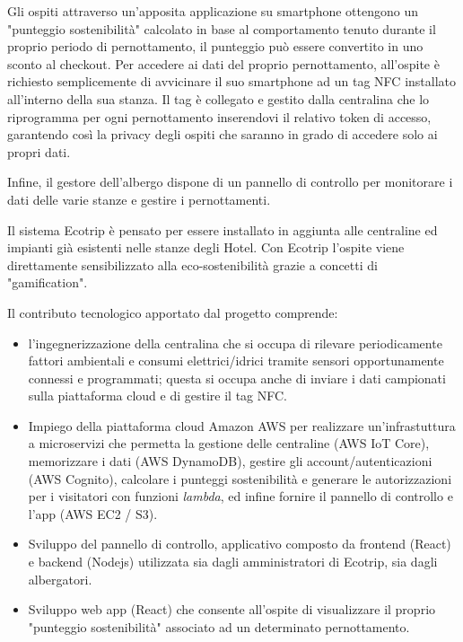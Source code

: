 Gli ospiti attraverso un'apposita applicazione su smartphone ottengono un "punteggio sostenibilità" calcolato in base al comportamento tenuto durante il proprio periodo di pernottamento, il punteggio 
può essere convertito in uno sconto al checkout. Per accedere ai dati del proprio pernottamento, all'ospite è richiesto semplicemente di avvicinare il suo smartphone ad un tag NFC installato all'interno della sua stanza.
Il tag è collegato e gestito dalla centralina che lo riprogramma per ogni pernottamento inserendovi il relativo token di accesso, garantendo così la privacy degli ospiti che saranno in grado di accedere solo ai propri dati.

Infine, il gestore dell'albergo dispone di un pannello di controllo per monitorare i dati delle varie stanze e gestire i pernottamenti.

Il sistema Ecotrip è pensato per essere installato in aggiunta alle centraline ed impianti già esistenti nelle stanze degli Hotel. 
Con Ecotrip l'ospite viene direttamente sensibilizzato alla eco-sostenibilità grazie a concetti di "gamification".


Il contributo tecnologico apportato dal progetto comprende:
\begin{itemize}
    \item l'ingegnerizzazione della centralina che si occupa di rilevare periodicamente fattori ambientali e consumi elettrici/idrici tramite sensori opportunamente connessi e programmati; questa si occupa anche di inviare i dati campionati sulla piattaforma cloud e di gestire il tag NFC. 
    \item Impiego della piattaforma cloud Amazon AWS per realizzare un'infrastuttura a microservizi che permetta la gestione delle centraline (AWS IoT Core), memorizzare i dati (AWS DynamoDB), gestire gli account/autenticazioni (AWS Cognito), calcolare i punteggi sostenibilità e generare le autorizzazioni per i visitatori con funzioni \textit{lambda}, ed infine fornire il pannello di controllo e l'app (AWS EC2 / S3).
    \item Sviluppo del pannello di controllo, applicativo composto da frontend (React) e backend (Nodejs) utilizzata sia dagli amministratori di Ecotrip, sia dagli albergatori. 
    \item Sviluppo web app (React) che consente all'ospite di visualizzare il proprio "punteggio sostenibilità" associato ad un determinato pernottamento.
\end{itemize}

\newpage
